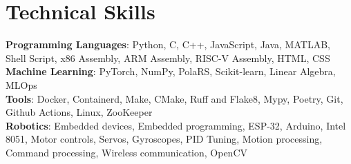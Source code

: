 \section{Technical Skills}

\begin{itemize}[leftmargin=0.15in, label={}]
  \small{\item{
\textbf{Programming Languages}{: %
  Python, %
  C, %
  C++, %
  JavaScript, %
  Java, %
  MATLAB, %
  Shell Script, %
  x86 Assembly, %
  ARM Assembly, %
  RISC-V Assembly, %
  HTML, %
  CSS %
}\\
\textbf{Machine Learning}{: %
  PyTorch, %
  NumPy, %
  PolaRS, %
  Scikit-learn, %
  Linear Algebra, %
  MLOps %
}\\
\textbf{Tools}{: %
  Docker, %
  Containerd, %
  Make, %
  CMake, %
  Ruff and Flake8, %
  Mypy, %
  Poetry, %
  Git, %
  Github Actions, %
  Linux, %
  ZooKeeper %
}\\
\textbf{Robotics}{: %
  Embedded devices, %
  Embedded programming, %
  ESP-32, %
  Arduino, %
  Intel 8051, %
  Motor controls, %
  Servos, %
  Gyroscopes, %
  PID Tuning, %
  Motion processing, %
  Command processing, %
  Wireless communication, %
  OpenCV %
}
   }}
 \end{itemize}



